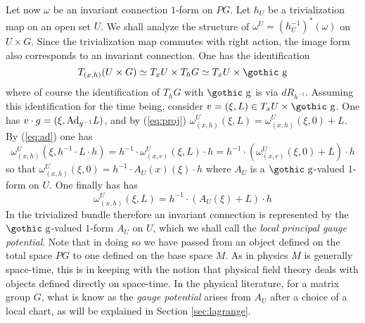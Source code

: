 \documentclass[12pt,titlepage]{article}
\def\goth#1{\hbox{\gothic #1}}
\def\gg{{\goth g}}
\def\Ad{\hbox{Ad}}
\begin{document}
Let now \(\omega\) be an invariant connection \(1\)-form on \(PG\).
Let \(h_U\) be a trivialization map on an open set \(U\).
We shall
analyze the structure of
\(\omega^U = (h_U^{-1})^*(\omega)\) on
  \(U\times G\). Since the trivialization map
commutes with right action, the image form also corresponds to an
invariant connection. One has the 
identification
\[
T_{(x,h)}(U\times G) \simeq T_xU\times T_hG \simeq
T_xU \times
\gg 
\]
where of course the identification of \(T_hG\) with \(\gg\) is via
\(dR_{h^{-1}}\).  Assuming this identification for the time being,
consider
 \(v=(\xi,L)\in  T_xU \times
\gg\). One has 
\(v\cdot g=(\xi, \Ad_{g^{-1}}L)\), and 
by (\ref{eq:proj})
\(\omega^U_{(x,h)}(\xi,L)= \omega^U_{(x,h)}(\xi,0) + L\).
By (\ref{eq:ad}) one has
\[
\omega^U_{(x,h)}(\xi, h^{-1}\cdot L\cdot h) = h^{-1}\cdot
\omega^U_{(x,e)}(\xi,L)\cdot h
=h^{-1}\cdot (\omega^U_{(x,e)}(\xi,0) +  L)\cdot h
\]
 so that
\(\omega^U_{(x,h)}(\xi,0) = h^{-1}\cdot A_U (x)(\xi)\cdot h\) where
\(A_U \) is a \(\gg\)-valued \(1\)-form on \(U\). One finally has
has
\begin{equation} \label{eq:oa}
\omega^U_{(x,h)}(\xi,L) = h^{-1}\cdot (A_U (\xi) +
L)\cdot h
\end{equation}%
In the trivialized bundle therefore an invariant connection is
represented by the \(\gg\)-valued \(1\)-form \(A_U \)
% 
on
\(U\), which we shall call the {\em
local principal gauge potential\/}.
% 
Note that in doing so we have
passed from an object defined on the total space \(PG\) to one
defined on the base space \(M\). As in physics \(M\) is
generally space-time, this is in keeping with the notion that physical
field theory  deals with objects defined directly on space-time.
 In the physical literature, for a matrix group \(G\), 
what is know as the {\em gauge potential\/} 
%
arises  from  \(A_U \)
after a choice of a local chart, as will be explained 
in Section \ref{sec:lagrange}.
\end{document}
